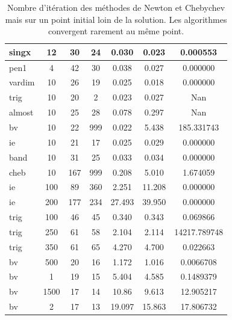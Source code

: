\begin{table}
\begin{center}
{\begin{tabular}{|l|c|c|c|c|c|c|}
   singx& 12 & 30 & 24 & 0.030 & 0.023 & 0.000553 \\\hline
   pen1& 4 & 42 & 30 & 0.038 & 0.027 & 0.000000 \\\hline
   vardim& 10 & 26 & 19 & 0.025 & 0.018 & 0.000000 \\\hline
   trig& 10 & 20 & 2 & 0.023 & 0.027 & Nan \\\hline
   almost& 10 & 25 & 28 & 0.078 & 0.297 & Nan \\\hline
   bv& 10 & 22 & 999 & 0.022 & 5.438 & 185.331743 \\\hline
   ie& 10 & 21 & 17 & 0.025 & 0.029 & 0.000000 \\\hline
   band& 10 & 31 & 25 & 0.033 & 0.034 & 0.000000 \\\hline
   cheb& 10 & 167 & 999 & 0.208 & 5.010 & 1.674059 \\\hline
   ie & 100 & 89 & 360 & 2.251 & 11.208 & 0.000000 \\\hline 
   ie& 200 & 177 & 234 & 27.493 & 39.950 & 0.000000 \\\hline
   trig& 100 & 46 & 45 & 0.340 & 0.343 & 0.069866 \\\hline 
   trig& 250 & 61 & 58 & 2.104 & 2.114 & 14217.789748 \\\hline  
   trig& 350 & 61 & 65 & 4.270 & 4.700 & 0.022663 \\\hline  
   bv& 500 & 20 & 16 & 1.172 & 1.016 & 0.0066708 \\\hline
   bv& 1 & 19 & 15 & 5.404 & 4.585 &  0.1489379 \\\hline
   bv& 1500 & 17 & 14 & 10.86 & 9.613 & 12.905217 \\\hline
   bv& 2 & 17 & 13 & 19.097 & 15.863 & 17.806732 \\\hline
\end{tabular}
}
	\end{center}
	\caption{Nombre d'it\'eration des m\'ethodes de Newton et Chebychev mais sur un point initial loin de la 
solution. Les algorithmes convergent rarement au même point.}
	\label{tab:111}
\end{table}





